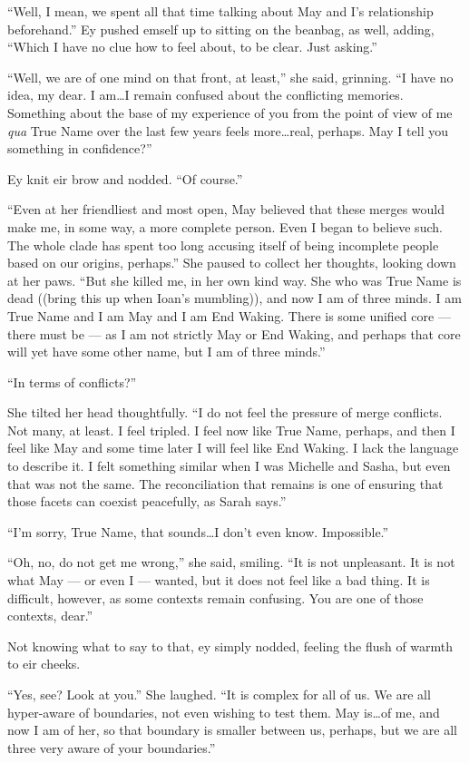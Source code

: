 ``Well, I mean, we spent all that time talking about May and I's relationship beforehand.'' Ey pushed emself up to sitting on the beanbag, as well, adding, ``Which I have no clue how to feel about, to be clear. Just asking.''

``Well, we are of one mind on that front, at least,'' she said, grinning. ``I have no idea, my dear. I am\ldots I remain confused about the conflicting memories. Something about the base of my experience of you from the point of view of me \emph{qua} True Name over the last few years feels more\ldots real, perhaps. May I tell you something in confidence?''

Ey knit eir brow and nodded. ``Of course.''

``Even at her friendliest and most open, May believed that these merges would make me, in some way, a more complete person. Even I began to believe such. The whole clade has spent too long accusing itself of being incomplete people based on our origins, perhaps.'' She paused to collect her thoughts, looking down at her paws. ``But she killed me, in her own kind way. She who was True Name is dead ((bring this up when Ioan's mumbling)), and now I am of three minds. I am True Name and I am May and I am End Waking. There is some unified core — there must be — as I am not strictly May or End Waking, and perhaps that core will yet have some other name, but I am of three minds.''

``In terms of conflicts?''

She tilted her head thoughtfully. ``I do not feel the pressure of merge conflicts. Not many, at least. I feel tripled. I feel now like True Name, perhaps, and then I feel like May and some time later I will feel like End Waking. I lack the language to describe it. I felt something similar when I was Michelle and Sasha, but even that was not the same. The reconciliation that remains is one of ensuring that those facets can coexist peacefully, as Sarah says.''

``I'm sorry, True Name, that sounds\ldots I don't even know. Impossible.''

``Oh, no, do not get me wrong,'' she said, smiling. ``It is not unpleasant. It is not what May — or even I — wanted, but it does not feel like a bad thing. It is difficult, however, as some contexts remain confusing. You are one of those contexts, dear.''

Not knowing what to say to that, ey simply nodded, feeling the flush of warmth to eir cheeks.

``Yes, see? Look at you.'' She laughed. ``It is complex for all of us. We are all hyper-aware of boundaries, not even wishing to test them. May is\ldots of me, and now I am of her, so that boundary is smaller between us, perhaps, but we are all three very aware of your boundaries.''


